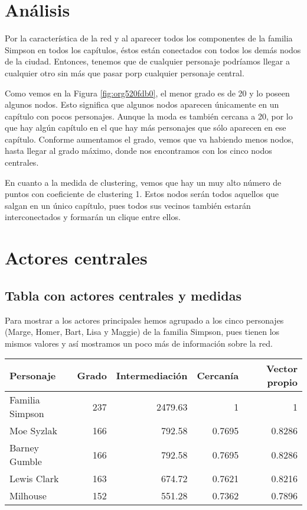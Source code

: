\documentclass[11pt]{article}
\begin{document}
\section{Análisis}
\label{sec:org53aebc9}

Por la característica de la red y al aparecer todos los componentes de
la familia Simpson en todos los capítulos, éstos están conectados con
todos los demás nodos de la ciudad. Entonces, tenemos que de cualquier
personaje podríamos llegar a cualquier otro sin más que pasar porp
cualquier personaje central. 

Como vemos en la Figura \ref{fig:org520fdb0}, el menor grado es de 20 y lo
poseen algunos nodos. Esto significa que algunos nodos aparecen
únicamente en un capítulo con pocos personajes. Aunque la moda es
también cercana a 20, por lo que hay algún capítulo en el que hay más
personajes que sólo aparecen en ese capítulo. Conforme aumentamos el
grado, vemos que va habiendo menos nodos, hasta llegar al grado
máximo, donde nos encontramos con los cinco nodos centrales. 

En cuanto a la medida de clustering, vemos que hay un muy alto número
de puntos con coeficiente de clustering 1. Estos nodos serán todos
aquellos que salgan en un único capítulo, pues todos sus vecinos
también estarán interconectados y formarán un clique entre ellos. 


\section{Actores centrales}
\label{sec:org81f1cd9}

\subsection{Tabla con actores centrales y medidas}
\label{sec:orgca66121}

Para mostrar a los actores principales hemos agrupado a los cinco
personajes (Marge, Homer, Bart, Lisa y Maggie) de la familia
Simpson, pues tienen los mismos valores y así mostramos un poco más de
información sobre la red. 

\begin{center}
\begin{tabular}{lrrrr}
Personaje & Grado & Intermediación & Cercanía & Vector propio\\
\hline
Familia Simpson & 237 & 2479.63 & 1 & 1\\
Moe Syzlak & 166 & 792.58 & 0.7695 & 0.8286\\
Barney Gumble & 166 & 792.58 & 0.7695 & 0.8286\\
Lewis Clark & 163 & 674.72 & 0.7621 & 0.8216\\
Milhouse & 152 & 551.28 & 0.7362 & 0.7896\\
\end{tabular}
\end{center}
\end{document}
